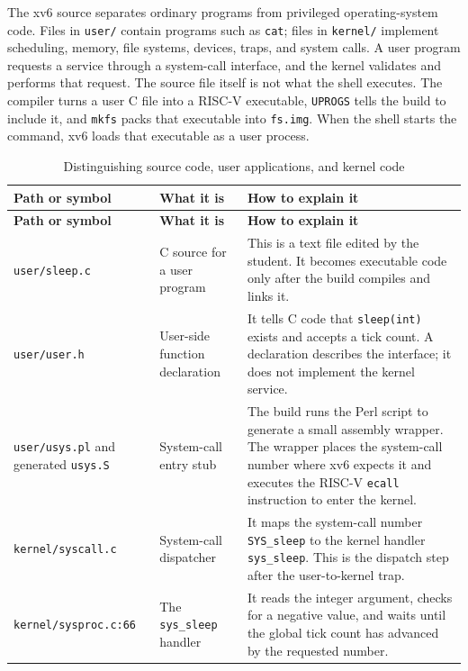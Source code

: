 \documentclass{assets/utmreport}
\begin{document}
The xv6 source separates ordinary programs from privileged operating-system code. Files in \texttt{user/} contain programs such as \texttt{cat}; files in \texttt{kernel/} implement scheduling, memory, file systems, devices, traps, and system calls. A user program requests a service through a system-call interface, and the kernel validates and performs that request. The source file itself is not what the shell executes. The compiler turns a user C file into a RISC-V executable, \texttt{UPROGS} tells the build to include it, and \texttt{mkfs} packs that executable into \texttt{fs.img}. When the shell starts the command, xv6 loads that executable as a user process.

\begin{longtable}{|p{3.0cm}|p{4.2cm}|p{7.2cm}|}
\caption{Distinguishing source code, user applications, and kernel code}
\label{tab:source-application-kernel}\\
\hline
\textbf{Path or symbol} & \textbf{What it is} & \textbf{How to explain it} \\
\hline
\endfirsthead
\hline
\textbf{Path or symbol} & \textbf{What it is} & \textbf{How to explain it} \\
\hline
\endhead
\texttt{user/}\newline\texttt{sleep.c} & C source for a user program & This is a text file edited by the student. It becomes executable code only after the build compiles and links it. \\
\hline
\texttt{user/}\newline\texttt{user.h} & User-side function declaration & It tells C code that \texttt{sleep(int)} exists and accepts a tick count. A declaration describes the interface; it does not implement the kernel service. \\
\hline
\texttt{user/}\newline\texttt{usys.pl} and generated \texttt{usys.S} & System-call entry stub & The build runs the Perl script to generate a small assembly wrapper. The wrapper places the system-call number where xv6 expects it and executes the RISC-V \texttt{ecall} instruction to enter the kernel. \\
\hline
\texttt{kernel/}\newline\texttt{syscall.c} & System-call dispatcher & It maps the system-call number \texttt{SYS\_sleep} to the kernel handler \texttt{sys\_sleep}. This is the dispatch step after the user-to-kernel trap. \\
\hline
\texttt{kernel/}\newline\texttt{sysproc.c:66} & The \texttt{sys\_sleep} handler & It reads the integer argument, checks for a negative value, and waits until the global tick count has advanced by the requested number. \\

\end{longtable}
\end{document}
